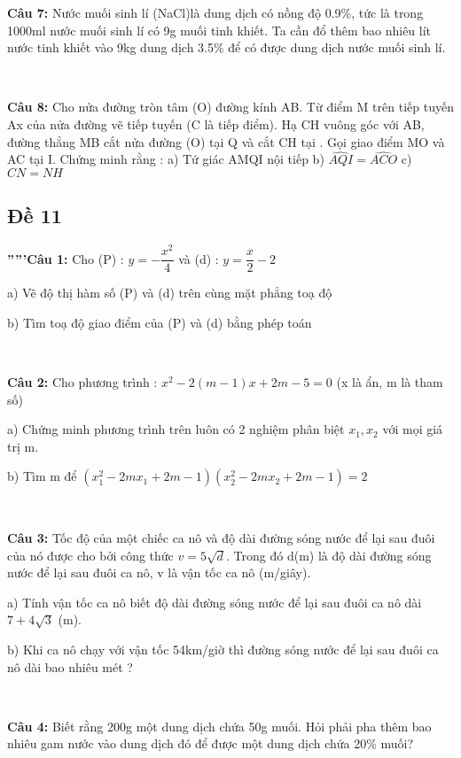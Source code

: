 \documentclass[12pt]{article}
\begin{document}
\textbf{Câu 7:} Nước muối sinh lí (NaCl)là dung dịch có nồng độ 0.9\%, tức là trong 1000ml nước muối sinh lí có 9g muối tinh khiết. Ta cần đổ thêm bao nhiêu lít nước tinh khiết vào 9kg dung dịch 3.5\% để có được dung dịch nước muối sinh lí.

\    

\textbf{Câu 8:} Cho nửa đường tròn tâm (O) đường kính AB. Từ điểm M trên tiếp tuyến Ax của nửa đường  vẽ tiếp tuyến  (C là tiếp điểm). Hạ CH vuông góc với AB, đường thẳng MB cắt nửa đường  (O) tại Q và cắt CH tại . Gọi giao điểm MO và AC tại I. Chứng minh rằng :
\newline a) Tứ giác AMQI nội tiếp
\newline b) $\widehat{AQI} = \widehat{ACO}$
\newline c) $CN = NH$

\break

\subsection{Đề 11}

\textbf{'''''Câu 1:} Cho (P) : $y = -\dfrac{x^2}{4}$ và (d) : $y = \dfrac{x}{2} - 2$ \par
a) Vẽ độ thị hàm số (P) và (d) trên cùng mặt phẳng toạ độ \par
b) Tìm toạ độ giao điểm của (P) và (d) bằng phép toán \par

\       

\textbf{Câu 2:} Cho phương trình : $x^2 - 2(m - 1)x + 2m - 5 = 0$ (x là ẩn, m là tham số) \par
a) Chứng minh phương trình trên luôn có 2 nghiệm phân biệt $x_1, x_2$ với mọi giá trị m. \par
b) Tìm m để $(x_1^2 - 2mx_1 + 2m - 1)(x_2^2 - 2mx_2 + 2m -1) = 2$

\    

\textbf{Câu 3:} Tốc độ của một chiếc ca nô và độ dài đường sóng nước để lại sau đuôi của nó được cho bởi công thức $v = 5\sqrt{d}$. Trong đó d(m) là độ dài đường sóng nước để lại sau đuôi ca nô, v là vận tốc ca nô (m/giây). \par
a) Tính vận tốc ca nô biết độ dài đường sóng nước để lại sau đuôi ca nô dài $7 + 4\sqrt{3}$ (m). \par
b) Khi ca nô chạy với vận tốc 54km/giờ thì đường sóng nước để lại sau đuôi ca nô dài bao nhiêu mét ?

\   

\textbf{Câu 4:} Biết rằng 200g một dung dịch chứa 50g muối. Hỏi phải pha thêm bao nhiêu gam nước vào dung dịch đó để được một dung dịch  chứa 20\% muối? \par
\end{document}

